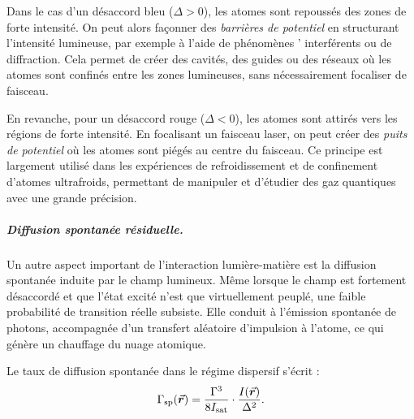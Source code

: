 \smallskip

Dans le cas d’un désaccord bleu (\( \Delta > 0 \)), les atomes sont repoussés des zones de forte intensité. On peut alors façonner des \textit{barrières de potentiel} en structurant l’intensité lumineuse, par exemple à l’aide de phénomènes ' interférents ou de diffraction. Cela permet de créer des cavités, des guides ou des réseaux où les atomes sont confinés entre les zones lumineuses, sans nécessairement focaliser de faisceau.

\smallskip

En revanche, pour un désaccord rouge (\( \Delta < 0 \)), les atomes sont attirés vers les régions de forte intensité. En focalisant un faisceau laser, on peut créer des \textit{puits de potentiel} où les atomes sont piégés au centre du faisceau. Ce principe est largement utilisé dans les expériences de refroidissement et de confinement d’atomes ultrafroids, permettant de manipuler et d’étudier des gaz quantiques avec une grande précision.

%

\subparagraph{Diffusion spontanée résiduelle.}

Un autre aspect important de l’interaction lumière-matière est la diffusion spontanée induite par le champ lumineux. Même lorsque le champ est fortement désaccordé et que l’état excité n’est que virtuellement peuplé, une faible probabilité de transition réelle subsiste. Elle conduit à l’émission spontanée de photons, accompagnée d’un transfert aléatoire d’impulsion à l’atome, ce qui génère un chauffage du nuage atomique.

Le taux de diffusion spontanée dans le régime dispersif s’écrit :
\begin{eqnarray}
\Gamma_{\mathrm{sp}}(\vec{{\bm{r}}}) =  \frac{\Gamma^3}{8 I_{\mathrm{sat}}} \cdot \frac{I(\vec{{\bm{r}}})}{\Delta^2}.
\label{eq:GammaSp}
\end{eqnarray}

